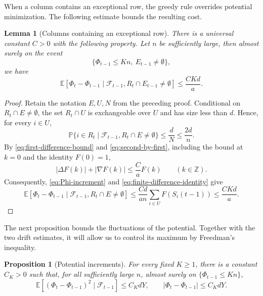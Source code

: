 \documentclass[reqno,english]{amsart}
\newcommand*{\ZZ}{\mathbb Z}
\newcommand*{\PP}{\mathbb P}
\newcommand*{\EE}{\mathbb E}
\newcommand*{\calF}{\mathcal F}
\newtheorem{proposition}[proposition]{Proposition}
\newtheorem{lemma}[lemma]{Lemma}
\theoremstyle{definition}
\begin{document}
{
When a column contains an exceptional row, the greedy rule overrides
potential minimization. The following estimate bounds the resulting cost.
}

\begin{lemma}[Columns containing an exceptional row]\label{lem:exceptional-column}
There is a universal constant $C>0$ with the following property.
Let $n$ be sufficiently large,
then almost surely on the event
\[
 \{\Phi_{t-1}\le Kn,\ E_{t-1}\ne\emptyset\},
\]
we have
\begin{equation}\label{eq:exceptional-column-cost}
 \EE[\Phi_t-\Phi_{t-1}\mid
      \calF_{t-1},R_t\cap E_{t-1}\ne\emptyset]
 \le \frac{CKd}{a}.
\end{equation}
\end{lemma}

\begin{proof}
{
Retain the notation $E,U,N$ from the preceding proof. Conditional on
$R_t\cap E\ne\emptyset$, the set $R_t\cap U$ is exchangeable over $U$
and has size less than $d$. Hence, for every $i\in U$,
\[
 \PP\{i\in R_t\mid\calF_{t-1},R_t\cap E\ne\emptyset\}
 \le\frac dN\le\frac{2d}{n}.
\]
By \eqref{eq:first-difference-bound} and \eqref{eq:second-by-first},
including the bound at $k=0$ and the identity $F(0)=1$,
\begin{equation}\label{eq:one-row-increment-bound}
 |\Delta F(k)|+|\nabla F(k)|\le\frac{C}{a}F(k)
 \qquad(k\in\ZZ).
\end{equation}
Consequently, \eqref{eq:Phi-increment} and
\eqref{eq:finite-difference-identity} give
\[
 \EE[\Phi_t-\Phi_{t-1}\mid\calF_{t-1},R_t\cap E\ne\emptyset]
 \le\frac{Cd}{an}\sum_{i\in U}F(S_i(t-1))
 \le\frac{CKd}{a}.
\]
}
\end{proof}

The next proposition bounds the fluctuations of the potential.  Together
with the two drift estimates, it will allow us to control its maximum by
Freedman's inequality.

\begin{proposition}[Potential increments]\label{prop:potential-increments}
For every fixed $K\ge1$, there is a constant $C_K>0$ such that, for all
sufficiently large $n$, almost surely on $\{\Phi_{t-1}\le Kn\}$,
\begin{equation}\label{eq:Phi-variance-increment}
 \EE[(\Phi_t-\Phi_{t-1})^2\mid\calF_{t-1}]\le C_KdY,
 \qquad
 |\Phi_t-\Phi_{t-1}|\le C_KdY.
\end{equation}
\end{proposition}
\end{document}

